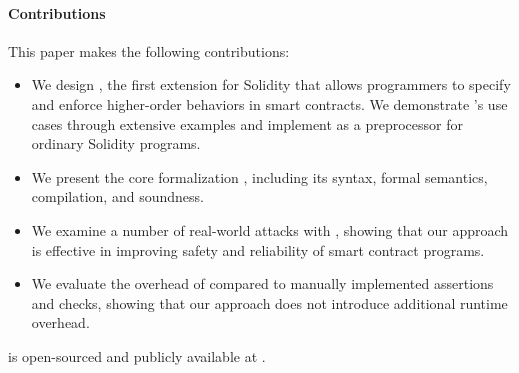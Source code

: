 
\paragraph{Contributions} This paper makes the following contributions:
\begin{itemize}
  \item We design \lang, the first extension for Solidity that allows programmers to
        specify and enforce higher-order behaviors in smart contracts.
        We demonstrate \lang's use cases through extensive examples and
        implement \lang as a preprocessor for ordinary Solidity programs.
  \item We present the core formalization \lang, including its syntax, formal
        semantics, compilation, and soundness.
  \item We examine a number of real-world attacks with \lang, showing that our
        approach is effective in improving safety and reliability of smart contract
        programs.
  \item We evaluate the overhead of \lang compared to manually implemented
        assertions and checks, showing that our approach does not introduce
        additional runtime overhead.
\end{itemize}

\lang is open-sourced and publicly available at .

